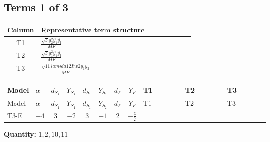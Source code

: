 \documentclass[8pt]{article}
\begin{document}
\begin{landscape}
\subsection*{Terms 1 of 3}
\begin{center}
\begin{tabular}{@{}c >{\raggedright\arraybackslash}p{0.82\linewidth}@{}}
\toprule
Column & Representative term structure \\
\midrule
T1 & \(\displaystyle \frac{\sqrt{3} g_{2}^{2} \overline{y_{1}} \overline{y_{2}}}{MF}\) \\
\midrule
T2 & \(\displaystyle \frac{\sqrt{3} g_{1}^{2} \overline{y_{1}} \overline{y_{2}}}{MF}\) \\
\midrule
T3 & \(\displaystyle \frac{\sqrt{11} lambda12Inv2 \overline{y_{1}} \overline{y_{2}}}{MF}\) \\
\midrule
\bottomrule
\end{tabular}
\end{center}
\smallskip
\tiny
\begin{longtable}{@{}llcccccc >{\raggedright\arraybackslash}p{0.21\linewidth} >{\raggedright\arraybackslash}p{0.21\linewidth} >{\raggedright\arraybackslash}p{0.21\linewidth}@{}}
\toprule
Model & $\alpha$ & $d_{S_1}$ & $Y_{S_1}$ & $d_{S_2}$ & $Y_{S_2}$ & $d_F$ & $Y_F$ & T1 & T2 & T3 \\
\midrule
\endfirsthead
\toprule
Model & $\alpha$ & $d_{S_1}$ & $Y_{S_1}$ & $d_{S_2}$ & $Y_{S_2}$ & $d_F$ & $Y_F$ & T1 & T2 & T3 \\
\midrule
\endhead
T3-E & $-4$ & $3$ & $-2$ & $3$ & $-1$ & $2$ & $-\frac{3}{2}$ & \scriptsize\adjustbox{max width=\linewidth}{$\begin{gathered} - \frac{15 \sqrt{3} g_{2}^{2} \overline{y_{1}} \overline{y_{2}}}{8 MF}\end{gathered}$} & \scriptsize\adjustbox{max width=\linewidth}{$\begin{gathered} - \frac{9 \sqrt{3} g_{1}^{2} \overline{y_{1}} \overline{y_{2}}}{8 MF}\end{gathered}$} & \scriptsize\adjustbox{max width=\linewidth}{$\begin{gathered} - \frac{3 \sqrt{11} lambda12Inv2 \overline{y_{1}} \overline{y_{2}}}{22 MF}\end{gathered}$} \\
\midrule
\bottomrule
\end{longtable}
\clearpage
\noindent\textbf{Quantity: }$\mathrm{1,2,10,11}$\par\smallskip

\end{landscape}
\end{document}
